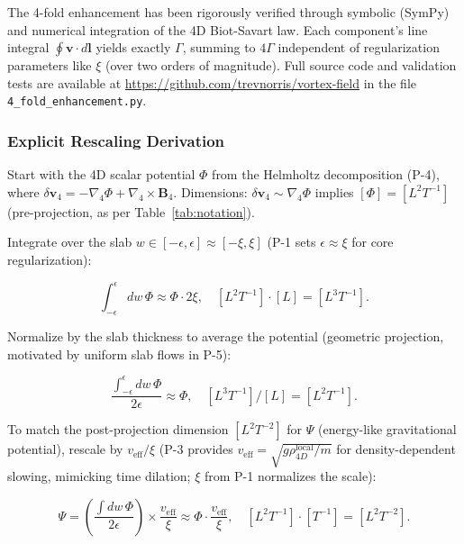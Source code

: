 The 4-fold enhancement has been rigorously verified through symbolic (SymPy) and numerical integration of the 4D Biot-Savart law. Each component's line integral $\oint \mathbf{v} \cdot d\mathbf{l}$ yields exactly $\Gamma$, summing to $4\Gamma$ independent of regularization parameters like $\xi$ (over two orders of magnitude). Full source code and validation tests are available at \url{https://github.com/trevnorris/vortex-field} in the file \verb|4_fold_enhancement.py|.

\subsubsection{Explicit Rescaling Derivation}

Start with the 4D scalar potential $\Phi$ from the Helmholtz decomposition (P-4), where $\delta \mathbf{v}_4 = -\nabla_4 \Phi + \nabla_4 \times \mathbf{B}_4$. Dimensions: $\delta \mathbf{v}_4 \sim \nabla_4 \Phi$ implies $[\Phi] = [L^2 T^{-1}]$ (pre-projection, as per Table~\ref{tab:notation}).

Integrate over the slab $w \in [-\epsilon, \epsilon] \approx [-\xi, \xi]$ (P-1 sets $\epsilon \approx \xi$ for core regularization):

\begin{equation}
\int_{-\epsilon}^{\epsilon} dw \, \Phi \approx \Phi \cdot 2\xi, \quad [L^2 T^{-1}] \cdot [L] = [L^3 T^{-1}].
\end{equation}

Normalize by the slab thickness to average the potential (geometric projection, motivated by uniform slab flows in P-5):

\begin{equation}
\frac{\int_{-\epsilon}^{\epsilon} dw \, \Phi}{2\epsilon} \approx \Phi, \quad [L^3 T^{-1}] / [L] = [L^2 T^{-1}].
\end{equation}

To match the post-projection dimension $[L^2 T^{-2}]$ for $\Psi$ (energy-like gravitational potential), rescale by $v_{\text{eff}} / \xi$ (P-3 provides $v_{\text{eff}} = \sqrt{g \rho_{4D}^{\text{local}} / m}$ for density-dependent slowing, mimicking time dilation; $\xi$ from P-1 normalizes the scale):

\begin{equation}
\Psi = \left( \frac{\int dw \, \Phi}{2\epsilon} \right) \times \frac{v_{\text{eff}}}{\xi} \approx \Phi \cdot \frac{v_{\text{eff}}}{\xi}, \quad [L^2 T^{-1}] \cdot [T^{-1}] = [L^2 T^{-2}].
\end{equation}

